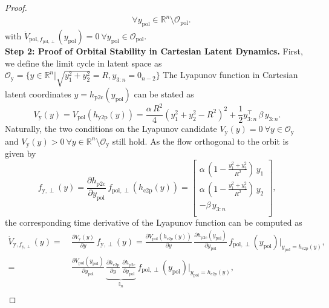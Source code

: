 \begin{proof}
\begin{equation}
\begin{split}
        \quad
        \forall y_\mathrm{pol} \in \mathbb{R}^{n} \setminus \mathcal{O}_\mathrm{pol}.
    \end{split}
    \end{equation}
    with $\dot{V}_{\mathrm{pol},f_{\mathrm{pol},\perp}}(y_\mathrm{pol}) = 0 \: \forall y_\mathrm{pol} \in \mathcal{O}_\mathrm{pol}$.\\
    \textbf{Step 2: Proof of Orbital Stability in Cartesian Latent Dynamics.}
    First, we define the limit cycle in latent space as $\mathcal{O}_\mathrm{y} = \{ y \in \mathbb{R}^n | \sqrt{y_1^2 + y_2^2} = R, y_{3:n} = 0_{n-2} \}$
    The Lyapunov function in Cartesian latent coordinates $y = h_\mathrm{p2c}(y_\mathrm{pol})$ can be stated as 
    \begin{equation}
        V_\mathrm{y}(y) = V_\mathrm{pol}(h_\mathrm{y2p}(y)) = \frac{\alpha \, R^2}{4} \left ( y_1^2+y_2^2 - R^2 \right )^2 + \frac{1}{2} y_{3:n}^\top \, \beta \, y_{3:n}.
    \end{equation}
    Naturally, the two conditions on the Lyapunov candidate $V_\mathrm{y}(y) = 0 \: \forall y \in \mathcal{O}_\mathrm{y}$ and $V_\mathrm{y}(y) > 0 \: \forall y \in \mathbb{R}^n \setminus \mathcal{O}_\mathrm{y}$ still hold. 
    As the flow orthogonal to the orbit is given by
    \begin{equation}
        f_{\mathrm{y},\perp}(y) = \frac{\partial h_\mathrm{p2c}}{\partial y_\mathrm{pol}} \, f_{\mathrm{pol},\perp}(h_\mathrm{c2p}(y)) = \begin{bmatrix}
        \alpha \, \left ( 1 - \frac{y_1^2 + y_2^2}{R^2} \right ) \, y_1\\
        \alpha \, \left ( 1 - \frac{y_1^2 + y_2^2}{R^2} \right ) \, y_2\\
        -\beta \, y_{3:n}\\
    \end{bmatrix},
    \end{equation}
    the corresponding time derivative of the Lyapunov function can be computed as
    \begin{equation}
    \begin{split}
        \dot{V}_{\mathrm{y},f_{\mathrm{y},\perp}}(y) =& \: \frac{\partial V_\mathrm{y}(y)}{\partial y} \, f_{\mathrm{y},\perp}(y) = \frac{\partial V_\mathrm{pol}(h_{c2p}(y))}{\partial y} \, \frac{\partial h_\mathrm{p2c}(y_\mathrm{pol})}{\partial y_\mathrm{pol}} \, f_{\mathrm{pol},\perp}(y_\mathrm{pol}) \Bigg |_{y_\mathrm{pol} = h_{c2p}(y)},\\
        =& \: \frac{\partial V_\mathrm{pol}(y_\mathrm{pol})}{\partial y_\mathrm{pol}} \, \underbrace{\frac{\partial h_\mathrm{c2p}}{\partial y} \, \frac{\partial h_\mathrm{p2c}}{\partial y_\mathrm{pol}}}_{\mathbb{I}_n} \, f_{\mathrm{pol},\perp}(y_\mathrm{pol}) \Bigg |_{y_\mathrm{pol} = h_{c2p}(y)},\\

\end{split}
\end{equation}
\end{proof}
